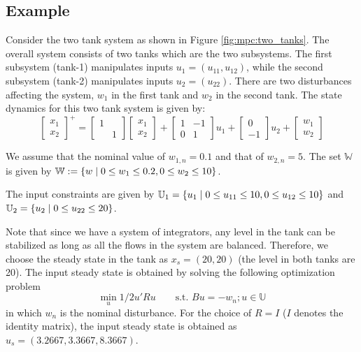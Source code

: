 \subsection{Example}
Consider the two tank system as shown in Figure
\ref{fig:mpc:two_tanks}. The overall system consists of two tanks which
are the two subsystems. The first subsystem (tank-1) manipulates inputs
$u_1 = (u_{11},u_{12})$, while the second subsystem (tank-2) manipulates
inputs $u_2 = (u_{22})$. There are two disturbances affecting the
system, $w_1$ in the first tank and $w_2$ in the second tank. The
state dynamics for this two tank system is given by:
\begin{equation*}
\begin{bmatrix}x_1\\x_2\end{bmatrix}^+ = \begin{bmatrix}1&\\ &
  1\end{bmatrix} \begin{bmatrix}x_1\\x_2\end{bmatrix}+
\begin{bmatrix} 1 & - 1 \\ 0&
  1 \end{bmatrix}u_1+ \begin{bmatrix}0\\-1\end{bmatrix}u_2
+ \begin{bmatrix}w_1\\w_2\end{bmatrix}
\end{equation*}

\begin{figure*}
\centering
\scriptsize
\resizebox{0.75\textwidth}{!}{}
\caption{Two tank system}
\label{fig:mpc:two_tanks}
\end{figure*}

We assume that the nominal value of $w_{1,n} = 0.1$ and that of $w_{2,n} =
5$. The set $\mathbb{W}$ is given by $\mathbb{W} := \left\lbrace w \mid 0\leq
  w_1\leq 0.2, 0 \leq w_2 \leq 10 \right\rbrace$.

The input constraints are given by $\mathbb{U}_1 = \left\lbrace u_1 \mid 0
  \leq u_{11} \leq 10, 0 \leq u_{12} \leq 10 \right\rbrace$ and $\mathbb{U}_2 =
\left\lbrace u_2 \mid 0 \leq u_{22} \leq 20 \right\rbrace$.

Note that since we have a system of integrators, any level in the tank
can be stabilized as long as all the flows in the system are
balanced. Therefore, we choose the steady state in the tank as $x_s =
(20,20)$ (the level in both tanks are 20). The input steady state is
obtained by solving the following optimization problem
\[ \min_{u}{1/2u'Ru} \qquad \text{s.t.~} Bu = -w_n ; u \in \mathbb{U} \]
in which $w_n$ is the nominal disturbance. For the choice of $R = I$
($I$ denotes the identity matrix), the input steady state  is obtained
as $u_s = (3.2667,3.3667,8.3667)$. 

